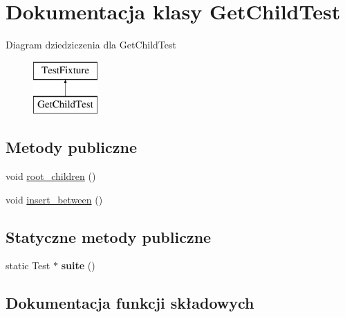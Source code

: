 \hypertarget{class_get_child_test}{}\section{Dokumentacja klasy Get\+Child\+Test}
\label{class_get_child_test}
Diagram dziedziczenia dla Get\+Child\+Test\begin{figure}[H]
\begin{center}
\leavevmode
\includegraphics[height=2.000000cm]{class_get_child_test}
\end{center}
\end{figure}
\subsection*{Metody publiczne}
\begin{DoxyCompactItemize}
\item 
void \hyperlink{class_get_child_test_a1385e9059ba424b000d5e15ab28bd19b}{root\+\_\+children} ()
\item 
void \hyperlink{class_get_child_test_a3bbc21e060e29cdcc15708c2f3d7d8d1}{insert\+\_\+between} ()
\end{DoxyCompactItemize}
\subsection*{Statyczne metody publiczne}
\begin{DoxyCompactItemize}
\item 
\mbox{\label{class_get_child_test_a4af2b9944cee3a7bf9f8a9ddc1729e47}} 
static Test $\ast$ {\bfseries suite} ()
\end{DoxyCompactItemize}


\subsection{Dokumentacja funkcji składowych}
\mbox{\label{class_get_child_test_a3bbc21e060e29cdcc15708c2f3d7d8d1}} 
